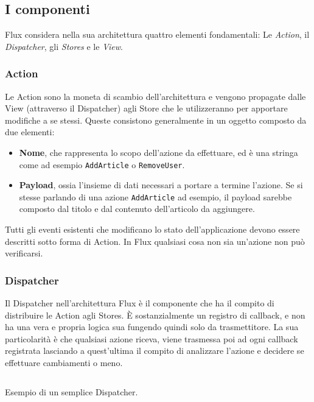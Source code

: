 \subsection{I componenti}
\label{FluxComponents}
Flux considera nella sua architettura quattro elementi fondamentali: Le \textit{Action}, il \textit{Dispatcher}, gli \textit{Stores} e le \textit{View}.

\subsubsection*{Action}
Le Action sono la moneta di scambio dell'architettura e vengono propagate dalle View (attraverso il Dispatcher) agli Store che le utilizzeranno per apportare modifiche a se stessi. Queste consistono generalmente in un oggetto composto da due elementi:

    \begin{itemize}
        \item \textbf{Nome}, che rappresenta lo scopo dell'azione da effettuare, ed è una stringa come ad esempio \texttt{AddArticle} o \texttt{RemoveUser}. 
        \item \textbf{Payload}, ossia l'insieme di dati necessari a portare a termine l'azione. Se si stesse parlando di una azione \texttt{AddArticle} ad esempio, il payload sarebbe composto dal titolo e dal contenuto dell'articolo da aggiungere.
    \end{itemize}

\noindent
Tutti gli eventi esistenti che modificano lo stato dell'applicazione devono essere descritti sotto forma di Action. In Flux qualsiasi cosa non sia un'azione non può verificarsi.

\subsubsection*{Dispatcher}
Il Dispatcher nell'architettura Flux è il componente che ha il compito di distribuire le Action agli Stores. È sostanzialmente un registro di callback, e non ha una vera e propria logica sua fungendo quindi solo da trasmettitore. La sua particolarità è che qualsiasi azione riceva, viene trasmessa poi ad ogni callback registrata lasciando a quest'ultima il compito di analizzare l'azione e decidere se effettuare cambiamenti o meno.

\begin{listing}[ht]
\inputminted{javascript}{sources/fluxDispatcherExample.js}
\caption{Esempio di un semplice Dispatcher.} 
\label{applicationMVCPresenterEvents} 
\end{listing} 

